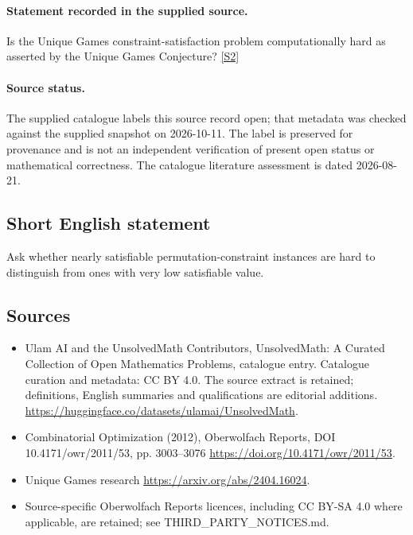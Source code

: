 \documentclass[11pt]{article}
\begin{document}
\paragraph{Statement recorded in the supplied source.}
Is the Unique Games constraint-satisfaction problem computationally hard as asserted by the Unique Games Conjecture? \href{https://doi.org/10.4171/owr/2011/53}{[S2]}
\paragraph{Source status.}
The supplied catalogue labels this source record open; that metadata was checked against the supplied snapshot on 2026-10-11. The label is preserved for provenance and is not an independent verification of present open status or mathematical correctness. The catalogue literature assessment is dated 2026-08-21.
\subsection{Short English statement}
Ask whether nearly satisfiable permutation-constraint instances are hard to distinguish from ones with very low satisfiable value.
\subsection{Sources}
\begin{itemize}
\item[S1] Ulam AI and the UnsolvedMath Contributors, UnsolvedMath: A Curated Collection of Open Mathematics Problems, catalogue entry. Catalogue curation and metadata: CC BY 4.0. The source extract is retained; definitions, English summaries and qualifications are editorial additions.
\url{https://huggingface.co/datasets/ulamai/UnsolvedMath}.
\item[S2] Combinatorial Optimization (2012), Oberwolfach Reports, DOI 10.4171/owr/2011/53, pp. 3003--3076
\url{https://doi.org/10.4171/owr/2011/53}.
\item[S3] Unique Games research
\url{https://arxiv.org/abs/2404.16024}.
\item Source-specific Oberwolfach Reports licences, including CC BY-SA 4.0 where applicable, are retained; see THIRD\_PARTY\_NOTICES.md.
\end{itemize}
\end{document}
